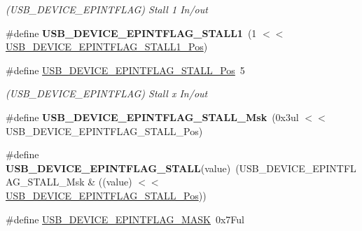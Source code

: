 \begin{DoxyCompactItemize}
\begin{DoxyCompactList}\small\item\em (U\+S\+B\+\_\+\+D\+E\+V\+I\+C\+E\+\_\+\+E\+P\+I\+N\+T\+F\+L\+A\+G) Stall 1 In/out \end{DoxyCompactList}\item 
\hypertarget{group___s_a_m_l21___u_s_b_ga79d90a3dbfa5a916503dabebf2f28c59}{}\#define {\bfseries U\+S\+B\+\_\+\+D\+E\+V\+I\+C\+E\+\_\+\+E\+P\+I\+N\+T\+F\+L\+A\+G\+\_\+\+S\+T\+A\+L\+L1}~(1 $<$$<$ \hyperlink{group___s_a_m_l21___u_s_b_gab51a1b5c0bb0578d0b838456fece2269}{U\+S\+B\+\_\+\+D\+E\+V\+I\+C\+E\+\_\+\+E\+P\+I\+N\+T\+F\+L\+A\+G\+\_\+\+S\+T\+A\+L\+L1\+\_\+\+Pos})\label{group___s_a_m_l21___u_s_b_ga79d90a3dbfa5a916503dabebf2f28c59}

\item 
\hypertarget{group___s_a_m_l21___u_s_b_ga4d44d127ab23a62ece4462dd85f3999f}{}\#define \hyperlink{group___s_a_m_l21___u_s_b_ga4d44d127ab23a62ece4462dd85f3999f}{U\+S\+B\+\_\+\+D\+E\+V\+I\+C\+E\+\_\+\+E\+P\+I\+N\+T\+F\+L\+A\+G\+\_\+\+S\+T\+A\+L\+L\+\_\+\+Pos}~5\label{group___s_a_m_l21___u_s_b_ga4d44d127ab23a62ece4462dd85f3999f}

\begin{DoxyCompactList}\small\item\em (U\+S\+B\+\_\+\+D\+E\+V\+I\+C\+E\+\_\+\+E\+P\+I\+N\+T\+F\+L\+A\+G) Stall x In/out \end{DoxyCompactList}\item 
\hypertarget{group___s_a_m_l21___u_s_b_ga8651b26a403bf7d9e4b94a14017625f4}{}\#define {\bfseries U\+S\+B\+\_\+\+D\+E\+V\+I\+C\+E\+\_\+\+E\+P\+I\+N\+T\+F\+L\+A\+G\+\_\+\+S\+T\+A\+L\+L\+\_\+\+Msk}~(0x3ul $<$$<$ U\+S\+B\+\_\+\+D\+E\+V\+I\+C\+E\+\_\+\+E\+P\+I\+N\+T\+F\+L\+A\+G\+\_\+\+S\+T\+A\+L\+L\+\_\+\+Pos)\label{group___s_a_m_l21___u_s_b_ga8651b26a403bf7d9e4b94a14017625f4}

\item 
\hypertarget{group___s_a_m_l21___u_s_b_ga359b0b3feda36a94f3cf41899b2725f5}{}\#define {\bfseries U\+S\+B\+\_\+\+D\+E\+V\+I\+C\+E\+\_\+\+E\+P\+I\+N\+T\+F\+L\+A\+G\+\_\+\+S\+T\+A\+L\+L}(value)~(U\+S\+B\+\_\+\+D\+E\+V\+I\+C\+E\+\_\+\+E\+P\+I\+N\+T\+F\+L\+A\+G\+\_\+\+S\+T\+A\+L\+L\+\_\+\+Msk \& ((value) $<$$<$ \hyperlink{group___s_a_m_l21___u_s_b_ga4d44d127ab23a62ece4462dd85f3999f}{U\+S\+B\+\_\+\+D\+E\+V\+I\+C\+E\+\_\+\+E\+P\+I\+N\+T\+F\+L\+A\+G\+\_\+\+S\+T\+A\+L\+L\+\_\+\+Pos}))\label{group___s_a_m_l21___u_s_b_ga359b0b3feda36a94f3cf41899b2725f5}

\item 
\hypertarget{group___s_a_m_l21___u_s_b_gacc06aa4c3afe5c8ed34d70dcca4268d5}{}\#define \hyperlink{group___s_a_m_l21___u_s_b_gacc06aa4c3afe5c8ed34d70dcca4268d5}{U\+S\+B\+\_\+\+D\+E\+V\+I\+C\+E\+\_\+\+E\+P\+I\+N\+T\+F\+L\+A\+G\+\_\+\+M\+A\+S\+K}~0x7\+Ful\label{group___s_a_m_l21___u_s_b_gacc06aa4c3afe5c8ed34d70dcca4268d5}


\end{DoxyCompactItemize}
